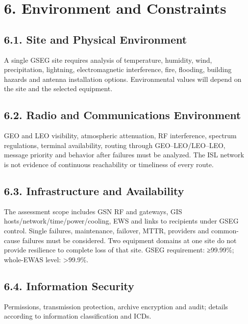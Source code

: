 \section{6. Environment and Constraints}\label{environment-and-constraints}

\subsection{6.1. Site and Physical Environment}\label{site-and-physical-environment}

A single GSEG site requires analysis of temperature, humidity, wind, precipitation, lightning, electromagnetic interference, fire, flooding, building hazards and antenna installation options. Environmental values will depend on the site and the selected equipment.

\subsection{6.2. Radio and Communications Environment}\label{radio-and-communications-environment}

GEO and LEO visibility, atmospheric attenuation, RF interference, spectrum regulations, terminal availability, routing through GEO–LEO/\allowbreak{}LEO–LEO, message priority and behavior after failures must be analyzed. The ISL network is not evidence of continuous reachability or timeliness of every route.

\subsection{6.3. Infrastructure and Availability}\label{infrastructure-and-service-availability}

The assessment scope includes GSN RF and gateways, GIS hosts/\allowbreak{}network/\allowbreak{}time/\allowbreak{}power/\allowbreak{}cooling, EWS and links to recipients under GSEG control. Single failures, maintenance, failover, MTTR, providers and common-cause failures must be considered. Two equipment domains at one site do not provide resilience to complete loss of that site. GSEG requirement: ≥99.99\%; whole-EWAS level: >99.9\%.

\subsection{6.4. Information Security}\label{information-security}

Permissions, transmission protection, archive encryption and audit; details according to information classification and ICDs.

